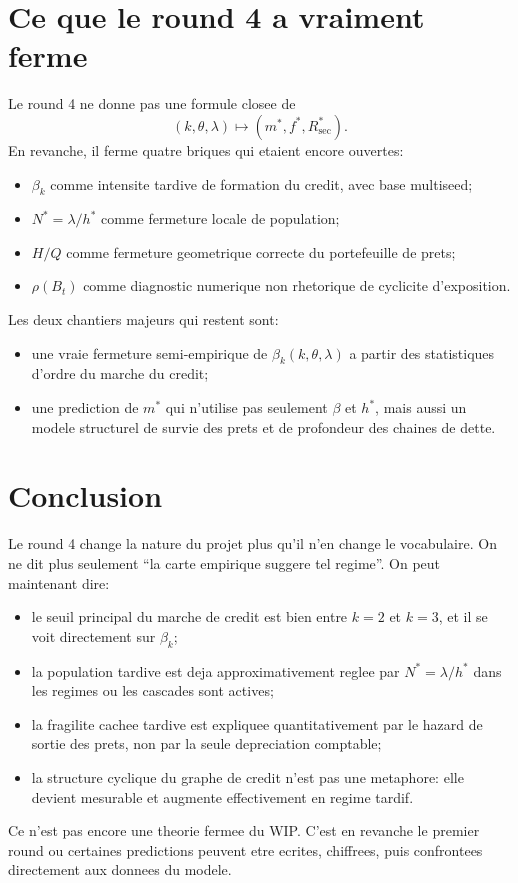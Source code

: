 \documentclass[11pt,a4paper]{article}
\begin{document}
\section{Ce que le round 4 a vraiment ferme}
Le round 4 ne donne pas une formule closee de
\[
(k,\theta,\lambda)\mapsto (m^*, f^*, R_{\mathrm{sec}}^*).
\]
En revanche, il ferme quatre briques qui etaient encore ouvertes:
\begin{itemize}
\item $\beta_k$ comme intensite tardive de formation du credit, avec base multiseed;
\item $N^*=\lambda/h^*$ comme fermeture locale de population;
\item $H/Q$ comme fermeture geometrique correcte du portefeuille de prets;
\item $\rho(B_t)$ comme diagnostic numerique non rhetorique de cyclicite d'exposition.
\end{itemize}

Les deux chantiers majeurs qui restent sont:
\begin{itemize}
\item une vraie fermeture semi-empirique de $\beta_k(k,\theta,\lambda)$ a partir des statistiques d'ordre du marche du credit;
\item une prediction de $m^*$ qui n'utilise pas seulement $\beta$ et $h^*$, mais aussi un modele structurel de survie des prets et de profondeur des chaines de dette.
\end{itemize}

\section{Conclusion}
Le round 4 change la nature du projet plus qu'il n'en change le vocabulaire. On ne dit plus seulement ``la carte empirique suggere tel regime''. On peut maintenant dire:
\begin{itemize}
\item le seuil principal du marche de credit est bien entre $k=2$ et $k=3$, et il se voit directement sur $\beta_k$;
\item la population tardive est deja approximativement reglee par $N^*=\lambda/h^*$ dans les regimes ou les cascades sont actives;
\item la fragilite cachee tardive est expliquee quantitativement par le hazard de sortie des prets, non par la seule depreciation comptable;
\item la structure cyclique du graphe de credit n'est pas une metaphore: elle devient mesurable et augmente effectivement en regime tardif.
\end{itemize}

Ce n'est pas encore une theorie fermee du WIP. C'est en revanche le premier round ou certaines predictions peuvent etre ecrites, chiffrees, puis confrontees directement aux donnees du modele.
\end{document}

